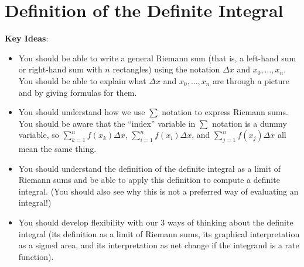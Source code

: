 \documentclass[main]{subfiles}
\begin{document}
\ifSubfilesClassLoaded{%
  \chaptermark{\chapterfive}
}{}

\section{Definition of the Definite Integral} \label{ws5-3}

\begin{problemonly}
    \begin{framed}

\textbf{Key Ideas}:

\begin{itemize}[topsep=0pt,partopsep=0pt,parsep=8pt,itemsep=0pt]

\item You should be able to write a general Riemann sum (that is, a
  left-hand sum or right-hand sum with $n$ rectangles) using the notation
  $\Delta x$ and $x_0, \ldots, x_n$.  You should be able to explain what
  $\Delta x$ and $x_0, \ldots, x_n$ are through a picture and by giving
  formulas for them.

\item You should understand how we use $\sum$ notation to express Riemann
  sums.  You should be aware that the  ``index'' variable in $\sum$
  notation is a dummy variable, so $\displaystyle \sum_{k=1}^n f(x_k)
  \Delta x$, $\displaystyle \sum_{i=1}^n f(x_i) \Delta x$, and
  $\displaystyle \sum_{j=1}^n f(x_j) \Delta x$ all mean
  the same thing.

\item You should understand the definition of the definite integral as a
  limit of Riemann sums and be able to apply this definition to compute a
  definite integral.  (You should also see why this is not a preferred way
  of evaluating an integral!)

\item You should develop flexibility with our 3 ways of thinking about the
  definite integral (its definition as a limit of Riemann sums, its
  graphical interpretation as a signed area, and its interpretation as net
  change if the integrand is a rate function). 

\end{itemize}
\end{framed}
\end{problemonly}
\end{document}

